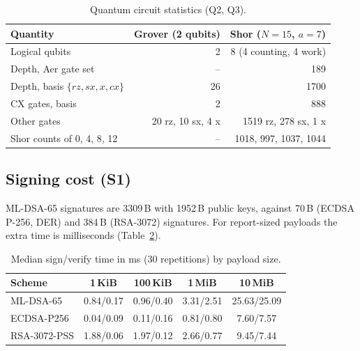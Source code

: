 \documentclass[conference]{IEEEtran}
\begin{document}
\begin{table}[t]
\caption{Quantum circuit statistics (Q2, Q3).}
\label{tab:circuits}
\centering
\scriptsize
\setlength{\tabcolsep}{3pt}
\begin{tabular}{@{}l r r@{}}
\toprule
Quantity & Grover (2 qubits) & Shor ($N=15$, $a=7$) \\
\midrule
Logical qubits & 2 & 8 (4 counting, 4 work) \\
Depth, Aer gate set & -- & 189 \\
Depth, basis $\{rz,sx,x,cx\}$ & 26 & 1700 \\
CX gates, basis & 2 & 888 \\
Other gates & 20 rz, 10 sx, 4 x & 1519 rz, 278 sx, 1 x \\
Shor counts of 0, 4, 8, 12 & -- & 1018, 997, 1037, 1044 \\
\bottomrule
\end{tabular}
\end{table}

\subsection{Signing cost (S1)}
ML-DSA-65 signatures are 3309\,B with 1952\,B public keys, against 70\,B (ECDSA P-256, DER) and 384\,B (RSA-3072) signatures. For report-sized payloads the extra time is milliseconds (Table~\ref{tab:signing}).

\begin{table}[t]
\caption{Median sign/verify time in ms (30 repetitions) by payload size.}
\label{tab:signing}
\centering
\scriptsize
\setlength{\tabcolsep}{3pt}
\begin{tabular}{@{}l c c c c@{}}
\toprule
Scheme & 1\,KiB & 100\,KiB & 1\,MiB & 10\,MiB \\
\midrule
ML-DSA-65 & 0.84/0.17 & 0.96/0.40 & 3.31/2.51 & 25.63/25.09 \\
ECDSA-P256 & 0.04/0.09 & 0.11/0.16 & 0.81/0.80 & 7.60/7.57 \\
RSA-3072-PSS & 1.88/0.06 & 1.97/0.12 & 2.66/0.77 & 9.45/7.44 \\
\bottomrule
\end{tabular}
\end{table}

\end{document}
